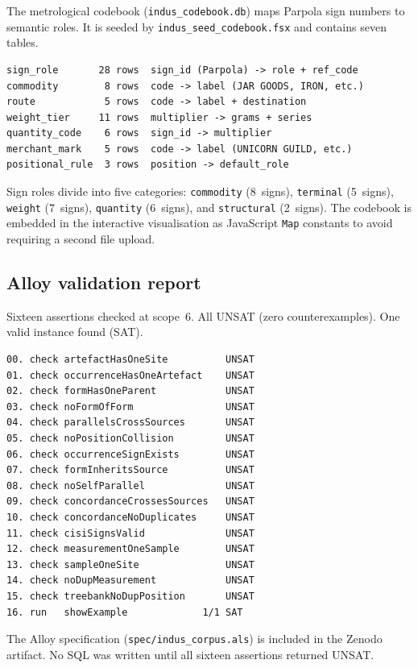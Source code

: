 The metrological codebook (\texttt{indus\_codebook.db}) maps Parpola
sign numbers to semantic roles. It is seeded by
\texttt{indus\_seed\_codebook.fsx} and contains seven tables.

{\small
\begin{verbatim}
sign_role       28 rows  sign_id (Parpola) -> role + ref_code
commodity        8 rows  code -> label (JAR GOODS, IRON, etc.)
route            5 rows  code -> label + destination
weight_tier     11 rows  multiplier -> grams + series
quantity_code    6 rows  sign_id -> multiplier
merchant_mark    5 rows  code -> label (UNICORN GUILD, etc.)
positional_rule  3 rows  position -> default_role
\end{verbatim}
}

\noindent
Sign roles divide into five categories: \texttt{commodity} (8~signs),
\texttt{terminal} (5~signs), \texttt{weight} (7~signs),
\texttt{quantity} (6~signs), and \texttt{structural} (2~signs).
The codebook is embedded in the interactive visualisation as
JavaScript \texttt{Map} constants to avoid requiring a second file
upload.

\subsection{Alloy validation report}

Sixteen assertions checked at scope~6. All UNSAT (zero
counterexamples). One valid instance found (SAT).

{\small
\begin{verbatim}
00. check artefactHasOneSite          UNSAT
01. check occurrenceHasOneArtefact    UNSAT
02. check formHasOneParent            UNSAT
03. check noFormOfForm                UNSAT
04. check parallelsCrossSources       UNSAT
05. check noPositionCollision         UNSAT
06. check occurrenceSignExists        UNSAT
07. check formInheritsSource          UNSAT
08. check noSelfParallel              UNSAT
09. check concordanceCrossesSources   UNSAT
10. check concordanceNoDuplicates     UNSAT
11. check cisiSignsValid              UNSAT
12. check measurementOneSample        UNSAT
13. check sampleOneSite               UNSAT
14. check noDupMeasurement            UNSAT
15. check treebankNoDupPosition       UNSAT
16. run   showExample             1/1 SAT
\end{verbatim}
}

\noindent
The Alloy specification (\texttt{spec/indus\_corpus.als}) is
included in the Zenodo artifact. No SQL was written until all
sixteen assertions returned UNSAT.

